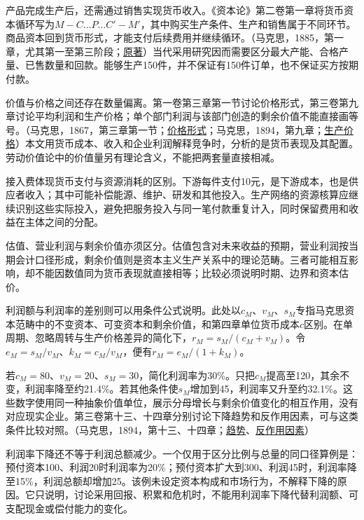 \documentclass[UTF8,fontset=windows,12pt,a4paper,oneside,openany]{ctexbook}
\begin{document}
产品完成生产后，还需通过销售实现货币收入。《资本论》第二卷第一章将货币资本循环写为$M-C\ldots P\ldots C'-M'$，其中购买生产条件、生产和销售属于不同环节。商品资本回到货币形式，才能支付后续费用并继续循环。（马克思，1885，第一章，尤其第一至第三阶段；\href{https://www.marxists.org/archive/marx/works/1885-c2/ch01.htm}{原著}）当代采用研究因而需要区分最大产能、合格产量、已售数量和回款。能够生产150件，并不保证有150件订单，也不保证买方按期付款。

价值与价格之间还存在数量偏离。第一卷第三章第一节讨论价格形式，第三卷第九章讨论平均利润和生产价格；单个部门利润与该部门创造的剩余价值不能直接画等号。（马克思，1867，第三章第一节；\href{https://www.marxists.org/archive/marx/works/1867-c1/ch03.htm}{价格形式}；马克思，1894，第九章；\href{https://www.marxists.org/archive/marx/works/1894-c3/ch09.htm}{生产价格}）本文用货币成本、收入和企业利润解释竞争时，分析的是货币表现及其配置。劳动价值论中的价值量另有理论含义，不能把两套量直接相减。

接入费体现货币支付与资源消耗的区别。下游每件支付10元，是下游成本，也是供应者收入；其中可能补偿能源、维护、研发和其他投入。生产网络的资源核算应继续识别这些实际投入，避免把服务投入与同一笔付款重复计入，同时保留费用和收益在主体之间的分配。

估值、营业利润与剩余价值亦须区分。估值包含对未来收益的预期，营业利润按当期会计口径形成，剩余价值则是资本主义生产关系中的理论范畴。三者可能相互影响，却不能因数值同为货币表现就直接相等；比较必须说明时期、边界和资本估价。

利润额与利润率的差别则可以用条件公式说明。此处以$c_M$、$v_M$、$s_M$专指马克思资本范畴中的不变资本、可变资本和剩余价值，和第四章单位货币成本$c$区别。在单周期、忽略周转与生产价格差异的简化下，$r_M=s_M/(c_M+v_M)$。令$e_M=s_M/v_M$、$k_M=c_M/v_M$，便有$r_M=e_M/(1+k_M)$。

若$c_M=80$、$v_M=20$、$s_M=30$，简化利润率为30\%。只把$c_M$提高至120，其余不变，利润率降至约21.4\%。若其他条件使$s_M$增加到45，利润率又升至约32.1\%。这些数字使用同一种抽象价值单位，展示分母增长与剩余价值变化的相互作用，没有对应现实企业。第三卷第十三、十四章分别讨论下降趋势和反作用因素，可与这类条件比较对照。（马克思，1894，第十三、十四章；\href{https://www.marxists.org/archive/marx/works/1894-c3/ch13.htm}{趋势}、\href{https://www.marxists.org/archive/marx/works/1894-c3/ch14.htm}{反作用因素}）

利润率下降还不等于利润总额减少。一个仅用于区分比例与总量的同口径算例是：预付资本100、利润20时利润率为20\%；预付资本扩大到300、利润45时，利润率降至15\%，利润总额却增加25。该例未设定资本构成和市场行为，不解释下降的原因。它只说明，讨论采用回报、积累和危机时，不能用利润率下降代替利润额、可支配现金或偿付能力的变化。
\end{document}
